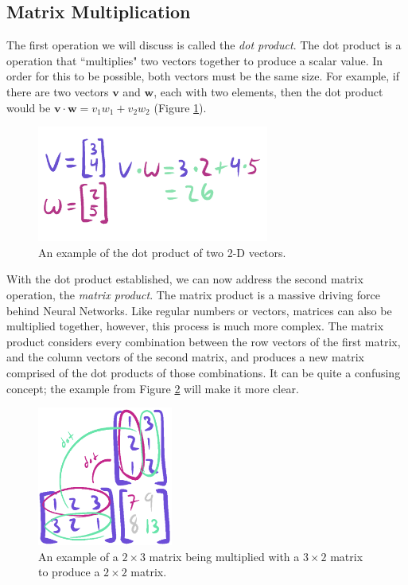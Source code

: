 \documentclass[12pt]{report}
\begin{document}
\subsection{Matrix Multiplication}
The first operation we will discuss is called the \emph{dot product}. The dot product is a operation that ``multiplies" two vectors together to produce a scalar value. In order for this to be possible, both vectors must be the same size. For example, if there are two vectors $\textbf{v}$ and $\textbf{w}$, each with two elements, then the dot product would be $\textbf{v} \cdot \textbf{w} = v_1 w_1 + v_2 w_2$ (Figure \ref{dotproduct}).
\begin{figure}[hbt!]
    \centering
    \includegraphics[width=3in]{figures/dotproduct.png}
    \caption{An example of the dot product of two 2-D vectors. }
    \label{dotproduct}
\end{figure}

With the dot product established, we can now address the second matrix operation, the \emph{matrix product}. The matrix product is a massive driving force behind Neural Networks. Like regular numbers or vectors, matrices can also be multiplied together, however, this process is much more complex. The matrix product considers every combination between the row vectors of the first matrix, and the column vectors of the second matrix, and produces a new matrix comprised of the dot products of those combinations. It can be quite a confusing concept; the example from Figure \ref{matmult} will make it more clear.
\begin{figure}[hbt!]
    \centering
    \includegraphics[width=1.75in]{figures/matmult.PNG}
    \caption{An example of a $2 \times 3$ matrix being multiplied with a $3 \times 2$ matrix to produce a $2 \times 2$ matrix.}
    \label{matmult}
\end{figure}
\end{document}
